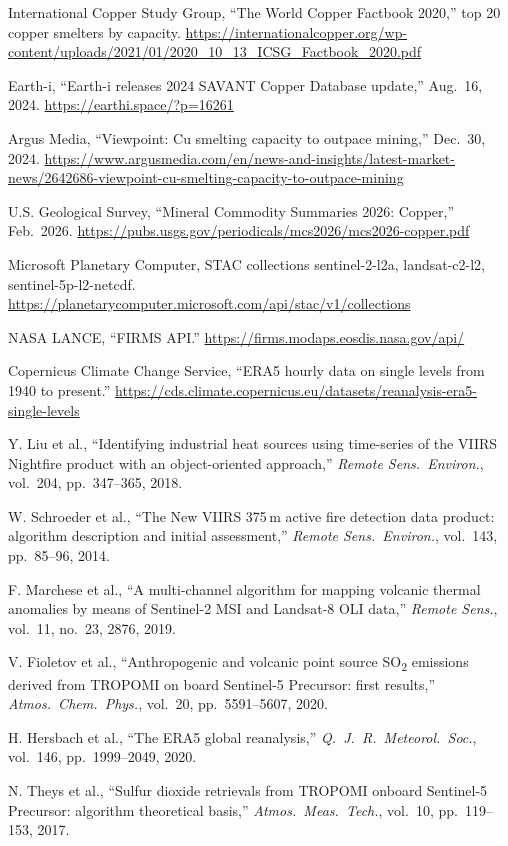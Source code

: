 \documentclass[10pt,a4paper]{article}
\newcommand{\SOtwo}{SO\textsubscript{2}}
\begin{document}
\begin{enumerate}[label={[\arabic*]},leftmargin=2.2em,itemsep=1pt]
\item International Copper Study Group, ``The World Copper Factbook 2020,'' top 20 copper smelters by capacity. \url{https://internationalcopper.org/wp-content/uploads/2021/01/2020_10_13_ICSG_Factbook_2020.pdf}
\item Earth-i, ``Earth-i releases 2024 SAVANT Copper Database update,'' Aug.\ 16, 2024. \url{https://earthi.space/?p=16261}
\item Argus Media, ``Viewpoint: Cu smelting capacity to outpace mining,'' Dec.\ 30, 2024. \url{https://www.argusmedia.com/en/news-and-insights/latest-market-news/2642686-viewpoint-cu-smelting-capacity-to-outpace-mining}
\item U.S. Geological Survey, ``Mineral Commodity Summaries 2026: Copper,'' Feb.\ 2026. \url{https://pubs.usgs.gov/periodicals/mcs2026/mcs2026-copper.pdf}
\item Microsoft Planetary Computer, STAC collections sentinel-2-l2a, landsat-c2-l2, sentinel-5p-l2-netcdf. \url{https://planetarycomputer.microsoft.com/api/stac/v1/collections}
\item NASA LANCE, ``FIRMS API.'' \url{https://firms.modaps.eosdis.nasa.gov/api/}
\item Copernicus Climate Change Service, ``ERA5 hourly data on single levels from 1940 to present.'' \url{https://cds.climate.copernicus.eu/datasets/reanalysis-era5-single-levels}
\item Y. Liu et al., ``Identifying industrial heat sources using time-series of the VIIRS Nightfire product with an object-oriented approach,'' \emph{Remote Sens.\ Environ.}, vol.\ 204, pp.\ 347--365, 2018.
\item W. Schroeder et al., ``The New VIIRS 375\,m active fire detection data product: algorithm description and initial assessment,'' \emph{Remote Sens.\ Environ.}, vol.\ 143, pp.\ 85--96, 2014.
\item F. Marchese et al., ``A multi-channel algorithm for mapping volcanic thermal anomalies by means of Sentinel-2 MSI and Landsat-8 OLI data,'' \emph{Remote Sens.}, vol.\ 11, no.\ 23, 2876, 2019.
\item V. Fioletov et al., ``Anthropogenic and volcanic point source \SOtwo{} emissions derived from TROPOMI on board Sentinel-5 Precursor: first results,'' \emph{Atmos.\ Chem.\ Phys.}, vol.\ 20, pp.\ 5591--5607, 2020.
\item H. Hersbach et al., ``The ERA5 global reanalysis,'' \emph{Q.\ J.\ R.\ Meteorol.\ Soc.}, vol.\ 146, pp.\ 1999--2049, 2020.
\item N. Theys et al., ``Sulfur dioxide retrievals from TROPOMI onboard Sentinel-5 Precursor: algorithm theoretical basis,'' \emph{Atmos.\ Meas.\ Tech.}, vol.\ 10, pp.\ 119--153, 2017.

\end{enumerate}
\end{document}

